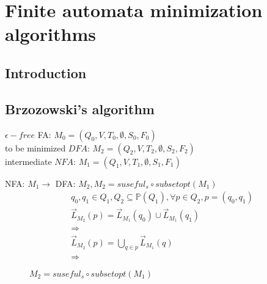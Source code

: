\chapter{Finite automata minimization algorithms}

\section{Introduction}

\section{Brzozowski's algorithm}

\begin{flushleft}
$\epsilon-free$ FA: $M_0=(Q_0,V,T_0,\emptyset,S_0,F_0)$ \\
to be minimized $DFA$: $M_2=(Q_2,V,T_2,\emptyset,S_2,F_2)$ \\
intermediate $NFA$: $M_1=(Q_1,V,T_1,\emptyset,S_1,F_1)$\\
\end{flushleft}

NFA: $M_1 \to $ DFA: $M_2, M_2=suseful_s\circ subsetopt(M_1)$
\begin{align*}
& q_0,q_1\in Q_1,Q_2\subseteq\mathbb{P}(Q_1),\forall p\in  Q_2,p=(q_0,q_1)\\
& \overrightarrow{L}_{M_2}(p)=\overrightarrow{L}_{M_1}(q_0)\cup  \overrightarrow{L}_{M_1}(q_1)\\
& \Rightarrow \\
& \overrightarrow{L}_{M_2}(p)=\bigcup_{q\in p}\overrightarrow{L}_{M_1}(q)\\
& \Rightarrow 
\end{align*}

\begin{figure}[htbp]
	\caption{$M_2=suseful_s\circ subsetopt(M_1)$}
\end{figure}

